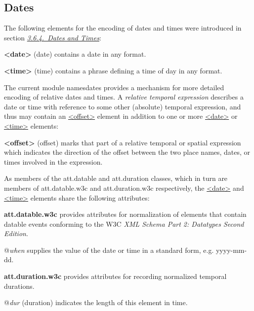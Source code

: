 \subsection[{Dates}]{Dates}\label{NDDATE}\par
The following elements for the encoding of dates and times were introduced in section \textit{\hyperref[CONADA]{3.6.4.\ Dates and Times}}: 
\begin{sansreflist}
  
\item [\textbf{<date>}] (date) contains a date in any format.
\item [\textbf{<time>}] (time) contains a phrase defining a time of day in any format.
\end{sansreflist}
\par
The current module \textsf{namesdates} provides a mechanism for more detailed encoding of relative dates and times. A \textit{relative temporal expression} describes a date or time with reference to some other (absolute) temporal expression, and thus may contain an \hyperref[TEI.offset]{<offset>} element in addition to one or more \hyperref[TEI.date]{<date>} or \hyperref[TEI.time]{<time>} elements: 
\begin{sansreflist}
  
\item [\textbf{<offset>}] (offset) marks that part of a relative temporal or spatial expression which indicates the direction of the offset between the two place names, dates, or times involved in the expression.
\end{sansreflist}
\par
As members of the \textsf{att.datable} and \textsf{att.duration} classes, which in turn are members of \textsf{att.datable.w3c} and \textsf{att.duration.w3c} respectively, the \hyperref[TEI.date]{<date>} and \hyperref[TEI.time]{<time>} elements share the following attributes: 
\begin{sansreflist}
  
\item [\textbf{att.datable.w3c}] provides attributes for normalization of elements that contain datable events conforming to the W3C \textit{XML Schema Part 2: Datatypes Second Edition}.\hfil\\[-10pt]\begin{sansreflist}
    \item[@{\itshape when}]
  supplies the value of the date or time in a standard form, e.g. yyyy-mm-dd.
\end{sansreflist}  
\item [\textbf{att.duration.w3c}] provides attributes for recording normalized temporal durations.\hfil\\[-10pt]\begin{sansreflist}
    \item[@{\itshape dur}]
  (duration) indicates the length of this element in time.
\end{sansreflist}  
\end{sansreflist}

